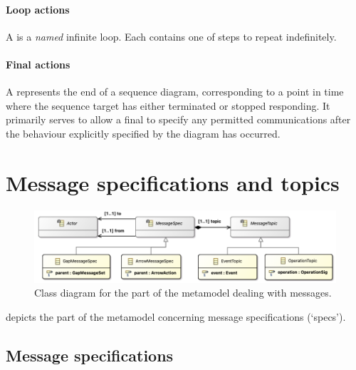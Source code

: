 \paragraph{Loop actions}

A \mloopaction{} is a \emph{named} infinite loop.    Each \mloopaction{} contains one
\msubsequence{} of steps to repeat indefinitely.

\paragraph{Final actions}

A \mfinalaction{} represents the end of a sequence diagram, corresponding
to a point in time where the sequence target has either terminated or stopped
responding.  It primarily serves to allow a final \msequencegap{} to specify
any permitted communications after the behaviour explicitly specified by the
diagram has occurred.


\section{Message specifications and topics}\label{sec:metamodel-messages}

\begin{figure}
	\centering
	\includegraphics[width=.8\textwidth]{diagrams/messages.png}
	\caption{Class diagram for the part of the \langname{} metamodel dealing with messages.}
	\label{fig:metamodel-messages}
\end{figure}

 depicts the part of the metamodel concerning
message specifications (`specs').

\subsection{Message specifications}

